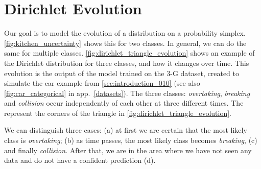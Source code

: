 \section{Dirichlet Evolution}
\label{dirichlet_triangle_evolution}

Our goal is to model the evolution of a distribution on a probability simplex. \cref{fig:kitchen_uncertainty} shows this for two classes. In general, we can do the same for multiple classes. \cref{fig:dirichlet_triangle_evolution} shows an example of the  Dirichlet distribution for three classes, and how it changes over time. This evolution is the output of the \DirModel model trained on the 3-G dataset, created to simulate the car example from \cref{sec:introduction_010} (see also \cref{fig:car_categorical} in app.~\ref{datasets}). The three classes: \textit{overtaking}, \textit{breaking} and \textit{collision} occur independently of each other at three different times. The represent the corners of the triangle in \cref{fig:dirichlet_triangle_evolution}.

We can distinguish three cases: (a) at first we are certain that the most likely class is \textit{overtaking}; (b) as time passes, the most likely class becomes \textit{breaking}, (c) and finally \textit{collision}. After that, we are in the area where we have not seen any data and do not have a confident prediction (d).

